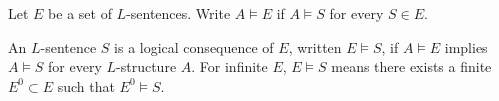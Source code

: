 Let $E$ be a set of $L$-sentences. Write $A \vDash E$ if $A \vDash S$ for every $S \in E$.

An $L$-sentence $S$ is a logical consequence of $E$, written $E \vDash S$, if $A \vDash E$ implies $A \vDash S$ for every $L$-structure $A$. For infinite $E$, $E \vDash S$ means there exists a finite $E^0 \subset E$ such that $E^0 \vDash S$.
